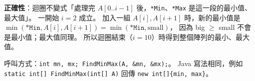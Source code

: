 \begin{pastsoln}
\textbf{正確性}：迴圈不變式「處理完 $A[0..i-1]$ 後，\texttt{*Min}、\texttt{*Max} 是這一段的最小值、最大值」。 一開始
$i = 2$ 成立。 加入一組 $A[i], A[i+1]$ 時，新的最小值是 $\min(\texttt{*Min}, A[i], A[i+1]) = \min(\texttt{*Min}, \text{small})$，
因為 big $\ge$ small 不會是最小值；最大值同理。 所以迴圈結束（$i = 10$）時得到整個陣列的最小、最大值。

呼叫方式：\texttt{int mn, mx; FindMinMax(A, \&mn, \&mx);}。 Java 寫法相同，例如 \texttt{static int[] FindMinMax(int[] A)}
回傳 \texttt{new int[]\{min, max\}}。
\end{pastsoln}
